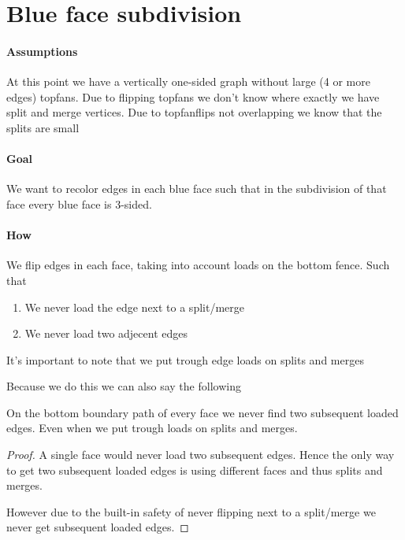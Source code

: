 
\section{Blue face subdivision}

\paragraph{Assumptions}
At this point we have a vertically one-sided graph without large (4 or more edges) topfans. Due to flipping topfans we don't know where exactly we have split and merge vertices. Due to topfanflips not overlapping we know that the splits are small 

\paragraph{Goal}
We want to recolor edges in each blue face such that in the subdivision of that face every blue face is 3-sided.


\paragraph{How}
We flip edges in each face, taking into account loads on the bottom fence. Such that

\begin{enumerate}
  \item We never load the edge next to a split/merge
  \item We never load two adjecent edges
\end{enumerate}

It's important to note that we put trough edge loads on splits and merges

Because we do this we can also say the following

\begin{lemma}
  \label{lm:}
  On the bottom boundary path of every face we never find two subsequent loaded edges. Even when we put trough loads on splits and merges.
\end{lemma}
\begin{proof}
  A single face would never load two subsequent edges. Hence the only way to get two subsequent loaded edges is using different faces and thus splits and merges.

  However due to the built-in safety of never flipping next to a split/merge we never get subsequent    loaded edges.
\end{proof}


